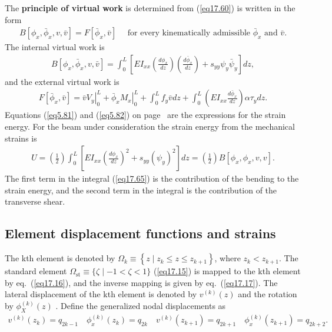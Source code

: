 \documentclass{AeroStructure-ERJohnson}
\begin{document}
\vspace*{-1pc}

The \textbf{principle of virtual work} is determined from (\ref{eq17.60}) is written in the form
\begin{align}\label{eq17.62}
B\left[\phi_{x}, \bar{\phi}_{x}, v, \bar{v}\right]=F\left[\bar{\phi}_{x}, \bar{v}\right] \quad \text { for every kinematically admissible } \bar{\phi}_{x} \text { and } \bar{v}.
\end{align}
The internal virtual work is
\begin{align}\label{eq17.63}
B\left[\phi_{x}, \bar{\phi}_{x}, v, \bar{v}\right]=\int_{0}^{L}\left[E I_{x x}\left(\frac{d \phi_{x}}{d z}\right)\left(\frac{d \bar{\phi}_{x}}{d z}\right)+s_{y y} \psi_{y} \bar{\psi}_{y}\right] d z,
\end{align}
and the external virtual work is
\begin{align}\label{eq17.64}
F\left[\bar{\phi}_{x}, \bar{v}\right]=\left.\bar{v} V_{y}\right|_{0} ^{L}+\left.\bar{\phi}_{x} M_{x}\right|_{0} ^{L}+\int_{0}^{L} f_{y} \bar{v} d z+\int_{0}^{L}\left(E I_{x x} \frac{d \bar{\phi}_{x}}{d z}\right) \alpha \tau_{y} d z .
\end{align}
Equations (\ref{eq5.81}) and (\ref{eq5.82}) on page~\pageref{eq5.82} are the expressions for the strain energy. For the beam under consideration the strain energy from the mechanical strains is
\begin{align}\label{eq17.65}
U=\left(\frac{1}{2}\right) \int_{0}^{L}\left[E I_{x x}\left(\frac{d \phi_{x}}{d z}\right)^{2}+s_{y y}\left(\psi_{y}\right)^{2}\right] d z=\left(\frac{1}{2}\right) B\left[\phi_{x}, \phi_{x}, v, v\right].
\end{align}
The first term in the integral (\ref{eq17.65}) is the contribution of the bending to the strain energy, and the second term in the integral is the contribution of the transverse shear.


\subsection{Element displacement functions and strains}\label{sec17.3.1}

The kth element is denoted by $\Omega_{k} \equiv\left\{z \mid z_{k} \leq z \leq z_{k+1}\right\}$, where $z_{k}<z_{k+1}$. The standard element $\Omega_{\mathrm{st}} \equiv\{\zeta \mid-1<\zeta<1\}$ (\ref{eq17.15}) is mapped to the kth element by eq.~(\ref{eq17.16}), and the inverse mapping is given by eq.~(\ref{eq17.17}). The lateral displacement of the kth element is denoted by $v^{(k)}(z)$ and the rotation by $\phi_{X}^{(k)}(z)$ . Define the generalized nodal displacements as
\begin{align}\label{eq17.66}
v^{(k)}\left(z_{k}\right)=q_{2 k-1} \quad \phi_{x}^{(k)}\left(z_{k}\right)=q_{2 k} \quad v^{(k)}\left(z_{k+1}\right)=q_{2 k+1} \quad \phi_{x}^{(k)}\left(z_{k+1}\right)=q_{2 k+2}.
\end{align}
\end{document}
